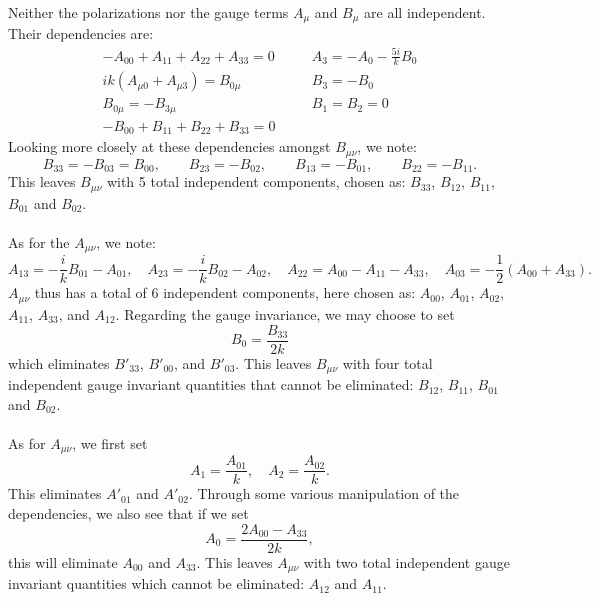\documentclass[10pt,letterpaper]{article}
\numberwithin{equation}{subsection}
\begin{document}
Neither the polarizations nor the gauge terms $A_\mu$ and $B_\mu$ are all independent. Their dependencies are:
\begin{align}
-A_{00} + A_{11}+A_{22} + A_{33} = 0&\quad&A_3 = -A_0 - \frac{5i}{k} B_0\nonumber\\
ik(A_{\mu 0} + A_{\mu 3}) = B_{0\mu} &\quad &B_3 = -B_0 \nonumber\\
B_{0\mu} = -B_{3\mu}&\quad& B_{1}=B_2 = 0\nonumber\\
-B_{00} + B_{11}+B_{22} + B_{33} = 0&\quad&
\end{align}
Looking more closely at these dependencies amongst $B_{\mu\nu}$, we note:
\begin{equation}
B_{33} = -B_{03} = B_{00},\qquad B_{23} = -B_{02},\qquad B_{13} = -B_{01},\qquad B_{22} = -B_{11}.
\end{equation}
This leaves $B_{\mu\nu}$ with 5 total independent components, chosen as: $B_{33}$, $B_{12}$, $B_{11}$, $B_{01}$ and $B_{02}$. 
\\ \\
As for the $A_{\mu\nu}$, we note:
\begin{equation}
A_{13} = -\frac{i}{k} B_{01} - A_{01},\quad
A_{23} = -\frac{i}{k}B_{02} - A_{02},\quad
A_{22} = A_{00} - A_{11} - A_{33},\quad
A_{03} = - \frac12 (A_{00}+A_{33}).
\end{equation}
$A_{\mu\nu}$ thus has a total of 6 independent components, here chosen as: $A_{00}$, $A_{01}$, $A_{02}$, $A_{11}$, $A_{33}$, and $A_{12}$. 
Regarding the gauge invariance, we may choose to set 
\begin{equation}
B_0 = \frac{B_{33}}{2k}
\end{equation}
which eliminates $B'_{33}$, $B'_{00}$, and $B'_{03}$. This leaves $B_{\mu\nu}$ with four total independent gauge invariant quantities that cannot be eliminated: $B_{12}$, $B_{11}$, $B_{01}$ and $B_{02}$. 
\\ \\
As for $A_{\mu\nu}$, we first set 
\begin{equation}
A_1 = \frac{A_{01}}{k},\quad A_2 = \frac{A_{02}}{k}.
\end{equation}
This eliminates $A'_{01}$ and $A'_{02}$. Through some various manipulation of the dependencies, we also see that if we set
\begin{equation}
A_0 = \frac{2A_{00} - A_{33}}{2k},
\end{equation}
this will eliminate $A_{00}$ and $A_{33}$. This leaves $A_{\mu\nu}$ with two total independent gauge invariant quantities which cannot be eliminated: $A_{12}$ and $A_{11}$. 
\end{document}
